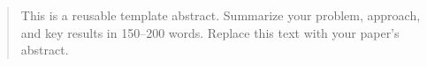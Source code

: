 \begin{abstract}
This is a reusable template abstract. Summarize your problem, approach, and key results in 150--200 words. Replace this text with your paper's abstract.
\end{abstract}

